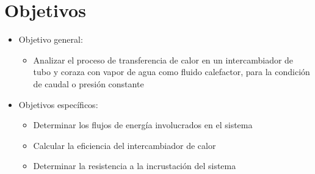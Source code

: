 \documentclass[twoside,twocolumn,letter,10pt]{article}
\begin{document}
\newpage
\section{Objetivos}
\begin{itemize}
\item{Objetivo general:}
\begin{itemize}
\item{Analizar el proceso de transferencia de calor en un intercambiador de tubo y coraza con vapor de agua como fluido calefactor, para la condición de caudal o presión constante}
\end{itemize}
\item{Objetivos específicos:}
\begin{itemize}
\item{Determinar los flujos de energía involucrados en el sistema}
\item{Calcular la eficiencia del intercambiador de calor}
\item{Determinar la resistencia a la incrustación del sistema}
\end{itemize}
\end{itemize}

\newpage
\end{document}
